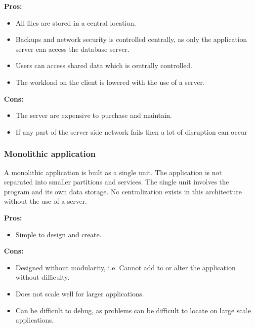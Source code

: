 \documentclass[11pt]{article}
\begin{document}
			\textbf{Pros:}
			\begin{itemize}
				\item All files are stored in a central location.
				\item Backups and network security is controlled centrally, as only the application server can access the database server.
				\item Users can access shared data which is centrally controlled.
				\item The workload on the client is lowered with the use of a server.\\		
			\end{itemize}
			
			\textbf{Cons:}
			\begin{itemize}
				\item The server are expensive to purchase and maintain.
				\item If any part of the server side network fails then a lot of disruption can occur				
			\end{itemize}
			
			\subsubsection{Monolithic application}
			
			\begin{flushleft}
				A monolithic application is built as a single unit. The application is not separated into smaller partitions and services. The single unit involves the program and its own data storage. No centralization exists in this architecture without the use of a server.				
			\end{flushleft}
		
			\textbf{Pros:}
			\begin{itemize}
				\item Simple to design and create.\\
			\end{itemize}
		
			\textbf{Cons:}
			\begin{itemize}
				\item Designed without modularity, i.e. Cannot add to or alter the application without difficulty.
				\item Does not scale well for larger applications.
				\item Can be difficult to debug, as problems can be difficult to locate on large scale applications.
			\end{itemize}
		
\end{document}
